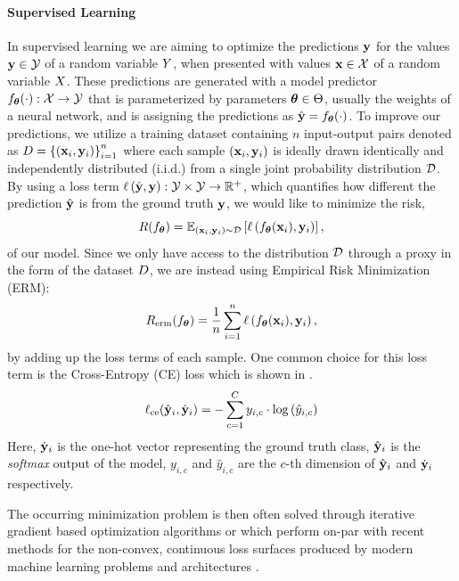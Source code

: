 \paragraph{Supervised Learning}
In supervised learning we are aiming to optimize the predictions $\mathbf{y}$ for the values $\mathbf{y} \in \mathcal{Y}$ of a random variable $Y$, when presented with values $\mathbf{x} \in \mathcal{X}$ of a random variable $X$. These predictions are generated with a model predictor $f_{\boldsymbol{\theta}}(\cdot): \mathcal{X} \rightarrow \mathcal{Y}$ that is parameterized by parameters $\boldsymbol{\theta} \in \Theta$, usually the weights of a neural network,  and is assigning the predictions as $\hat{\mathbf{y}}=f_{\boldsymbol{\theta}}(\cdot)$. To improve our predictions, we utilize a training dataset containing $n$ input-output pairs denoted as $D=\left\{\left(\mathbf{x}_i, \mathbf{y}_i \right)\right\}_{i=1}^{n}$ where each sample $(\mathbf{x}_i, \mathbf{y}_i)$ is ideally drawn identically and independently distributed (i.i.d.) from a single joint probability distribution $\mathcal{D}$. By using a loss term $\ell\left(\hat{\mathbf{y}}, \mathbf{y}\right): \mathcal{Y} \times \mathcal{Y} \rightarrow \mathbb{R}^{+}$, which quantifies how different the prediction $\hat{\mathbf{y}}$ is from the ground truth $\mathbf{y}$, we would like to minimize the risk,
\begin{equation}
    R(f_{\boldsymbol{\theta}}) = \mathbb{E}_{(\mathbf{x}_i, \mathbf{y}_i) \sim \mathcal{D}}\left[\ell\left(f_{\boldsymbol{\theta}}(\mathbf{x}_i), \mathbf{y}_i\right)\right],
\end{equation}
of our model. Since we only have access to the distribution $\mathcal{D}$ through a proxy in the form of the dataset $D$, we are instead using Empirical Risk Minimization (ERM):
\begin{equation}
    R_{\mathrm{erm}}(f_{\boldsymbol{\theta}}) =\frac{1}{n} \sum_{i=1}^n \ell\left(f_{\boldsymbol{\theta}}(\mathbf{x}_i), \mathbf{y}_i\right),
\end{equation}
by adding up the loss terms of each sample. One common choice for this loss term is the Cross-Entropy (CE) loss which is shown in .
\begin{equation}
\label{eq:cross_entropy}
    \ell_{\mathrm{ce}}(\hat{\mathbf{y}}_i, \dot{\mathbf{y}}_i)=-\sum_{c=1}^{C} y_{i, c} \cdot \log \left(\hat{y}_{i, c}\right)
\end{equation}
Here, $\dot{\mathbf{y}}_i$ is the one-hot vector representing the ground truth class, $\hat{\mathbf{y}}_i$ is the \emph{softmax} output of the model, $y_{i, c}$ and $\hat{y}_{i, c}$ are the $c$-th dimension of $\hat{\mathbf{y}}_i$ and $\dot{\mathbf{y}}_i$ respectively.

The occurring minimization problem is then often solved through iterative gradient based optimization algorithms \eg \sgd{} \citep{Robbins1951} or \adam \citep{Kingma2015} which perform on-par with recent methods for the non-convex, continuous loss surfaces produced by modern machine learning problems and architectures \citep{schmidt2020descending}.

